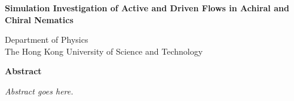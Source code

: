 \begin{center}
{\Large\bf Simulation Investigation of Active and Driven Flows in Achiral and Chiral Nematics}
\vspace{0.5cm}

{\large \bf \thesisWriter{}}\normalsize

\medskip

Department of Physics\\ The Hong Kong University of Science and Technology

\end{center}
\vspace{1.5cm}
\centerline{{\bf \large Abstract}}
\vspace{1.5cm}

{\it Abstract goes here.}

